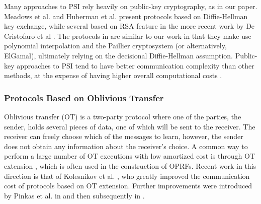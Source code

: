 Many approaches to PSI rely heavily on public-key cryptography, as
in our paper. Meadows et al. \cite{Meadows} and Huberman et al. \cite{Huberman}
present protocols based on Diffie-Hellman key exchange, while several
based on RSA feature in the more recent work by De Cristofaro et al
\cite{DeCristofaro}. The protocols in \cite{Freedman2004,Freedman2016}
are similar to our work in that they make use polynomial interpolation
and the Paillier cryptosystem (or alternatively, ElGamal), ultimately
relying on the decisional Diffie-Hellman assumption. Public-key approaches
to PSI tend to have better communication complexity than other methods,
at the expense of having higher overall computational costs \cite{Pinkas}.

\subsubsection{Protocols Based on Oblivious Transfer}

Oblivious transfer (OT) \cite{Rabin} is a two-party protocol where
one of the parties, the sender, holds several pieces of data, one
of which will be sent to the receiver. The receiver can freely choose
which of the messages to learn, however, the sender does not obtain
any information about the receiver's choice. A common way to perform
a large number of OT executions with low amortized cost is through
OT extension \cite{Pinkas}, which is often used in the construction
of OPRFs. Recent work in this direction is that of Kolesnikov et al.
\cite{Kolesnikov}, who greatly improved the communication cost of protocols
based on OT extension. Further improvements were introduced by Pinkas
et al. in \cite{Pinkas} and then subsequently in \cite{SpOT}.